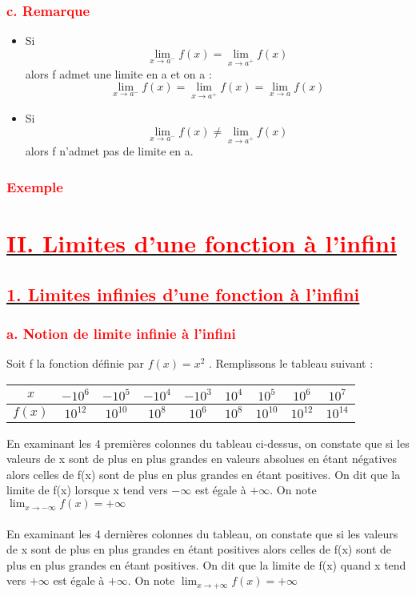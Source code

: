 \documentclass[12pt]{article}
\begin{document}
\subsubsection*{\textcolor{red}{c. Remarque}}
\begin{itemize}
\item Si \[\lim_{x \to a^{-}}f(x) = \lim_{x \to a^{+}}f(x)\] alors f admet une limite en a et on a :
\[\lim_{x \to a^{-}}f(x) = \lim_{x \to a^{+}}f(x)=\lim_{x \to a}f(x)\]
\item Si \[\lim_{x \to a^{-}}f(x) \neq \lim_{x \to a^{+}}f(x)\] alors f n’admet pas de limite en a.\\
\end{itemize}
\subsubsection*{\textcolor{red}{Exemple}}
\section*{\underline{\textbf{\textcolor{red}{II. Limites d’une fonction à l’infini}}}}
\subsection*{\underline{\textbf{\textcolor{red}{1. Limites infinies d’une fonction à l’infini}}}}
\subsubsection*{\textcolor{red}{a. Notion de limite infinie à l’infini}}
Soit f la fonction définie par $f(x) = x^{2}$ . Remplissons le tableau suivant :\\
\begin{center}
\begin{tabular}{|c|c|c|c|c|c|c|c|c|}
\hline
$x$ & $-10^{6}$ & $-10^{5}$ & $-10^{4}$ &$-10^{3}$ & $10^{4}$ & $10^{5}$ & $10^{6}$ & $10^{7}$\\
\hline
$f(x)$ &$10^{12}$&$10^{10}$ &$10^{8}$ &$10^{6}$ &$10^{8}$ &$10^{10}$ &$10^{12}$ &$10^{14}$\\
\hline
\end{tabular}
\end{center}
En examinant les 4 premières colonnes du tableau ci-dessus, on constate que si les valeurs de x sont de plus en plus grandes en valeurs absolues en étant négatives alors celles de f(x) sont de plus en plus grandes en étant positives. On dit que la limite de f(x) lorsque x tend vers $-\infty$ est égale à $+\infty$. On note $\lim_{x \to -\infty}f(x)=+\infty$\\
\\
En examinant les 4 dernières colonnes du tableau, on constate que si les valeurs de x sont de
plus en plus grandes en étant positives alors celles de f(x) sont de plus en plus grandes en étant positives. On dit que la limite de f(x) quand x tend vers $+\infty$ est égale à $+\infty$. On note $\lim_{x \to +\infty}f(x)=+\infty$\\
\end{document}
